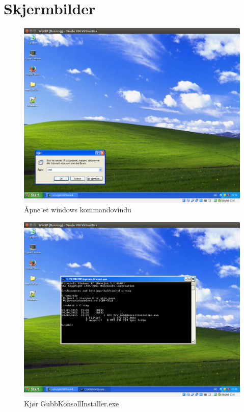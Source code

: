 \documentclass[12pt]{book}
\begin{document}
\appendix
\chapter{Skjermbilder}

\begin{figure}[h]
\includegraphics[width=15cm]{003}
\caption{Åpne et windows kommandovindu}
\end{figure}

\begin{figure}[h]
\includegraphics[width=15cm]{004}
\caption{Kjør GubbKonsollInstaller.exe }
\end{figure}
\end{document}
